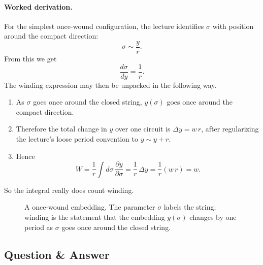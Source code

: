 \paragraph{Worked derivation.} For the simplest once-wound configuration, the lecture identifies \(\sigma\) with position around the compact direction:
\begin{equation}
\sigma \sim \frac{y}{r}.
\end{equation}
From this we get
\begin{equation}
\frac{d\sigma}{dy}=\frac{1}{r}.
\end{equation}
The winding expression may then be unpacked in the following way.
\begin{enumerate}
\item As \(\sigma\) goes once around the closed string, \(y(\sigma)\) goes once around the compact direction.
\item Therefore the total change in \(y\) over one circuit is \(\Delta y = w\,r\), after regularizing the lecture's loose period convention to \(y\sim y+r\).
\item Hence
\begin{equation}
W=\frac{1}{r}\int d\sigma\,\frac{\partial y}{\partial \sigma}
  =\frac{1}{r}\,\Delta y
  =\frac{1}{r}(w\,r)
  =w.
\end{equation}
\end{enumerate}
So the integral really does count winding.

\begin{figure}[htbp]
\centering
{}
\caption{A once-wound embedding. The parameter \(\sigma\) labels the string; winding is the statement that the embedding \(y(\sigma)\) changes by one period as \(\sigma\) goes once around the closed string.}
\end{figure}

\subsection{Question \& Answer}

